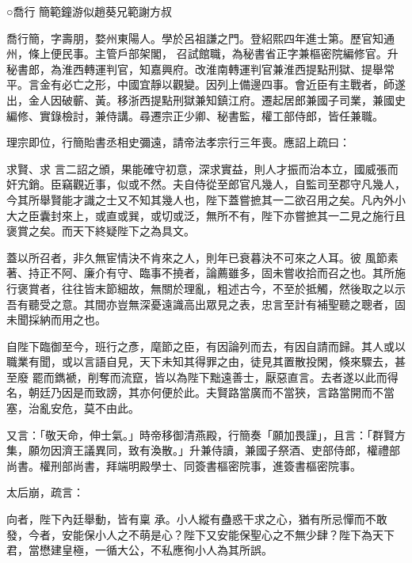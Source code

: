 
\begin{pinyinscope}

 ○喬行
 簡範鐘游似趙葵兄範謝方叔



 喬行簡，字壽朋，婺州東陽人。學於呂祖謙之門。登紹熙四年進士第。歷官知通州，條上便民事。主管戶部架閣，
 召試館職，為秘書省正字兼樞密院編修官。升秘書郎，為淮西轉運判官，知嘉興府。改淮南轉運判官兼淮西提點刑獄、提舉常平。言金有必亡之形，中國宜靜以觀變。因列上備邊四事。會近臣有主戰者，師遂出，金人因破蘄、黃。移浙西提點刑獄兼知鎮江府。遷起居郎兼國子司業，兼國史編修、實錄檢討，兼侍講。尋遷宗正少卿、秘書監，權工部侍郎，皆任兼職。



 理宗即位，行簡貽書丞相史彌遠，請帝法孝宗行三年喪。應詔上疏曰：



 求賢、求
 言二詔之頒，果能確守初意，深求實益，則人才振而治本立，國威張而奸宄銷。臣竊觀近事，似或不然。夫自侍從至郎官凡幾人，自監司至郡守凡幾人，今其所舉賢能才識之士又不知其幾人也，陛下蓋嘗摭其一二欲召用之矣。凡內外小大之臣囊封來上，或直或巽，或切或泛，無所不有，陛下亦嘗摭其一二見之施行且褒賞之矣。而天下終疑陛下之為具文。



 蓋以所召者，非久無宦情決不肯來之人，則年已衰暮決不可來之人耳。彼
 風節素著、持正不阿、廉介有守、臨事不撓者，論薦雖多，固未嘗收拾而召之也。其所施行褒賞者，往往皆末節細故，無關於理亂，粗述古今，不至於抵觸，然後取之以示吾有聽受之意。其間亦豈無深憂遠識高出眾見之表，忠言至計有補聖聽之聰者，固未聞採納而用之也。



 自陛下臨御至今，班行之彥，麾節之臣，有因論列而去，有因自請而歸。其人或以職業有聞，或以言語自見，天下未知其得罪之由，徒見其置散投閑，倏來驟去，甚至廢
 罷而鐫褫，削奪而流竄，皆以為陛下黜遠善士，厭惡直言。去者遂以此而得名，朝廷乃因是而致謗，其亦何便於此。夫賢路當廣而不當狹，言路當開而不當塞，治亂安危，莫不由此。



 又言：「敬天命，伸士氣。」時帝移御清燕殿，行簡奏「願加畏謹」，且言：「群賢方集，願勿因濟王議異同，致有渙散。」升兼侍讀，兼國子祭酒、吏部侍郎，權禮部尚書。權刑部尚書，拜端明殿學士、同簽書樞密院事，進簽書樞密院事。



 太后崩，疏言：



 向者，陛下內廷舉動，皆有稟
 承。小人縱有蠱惑干求之心，猶有所忌憚而不敢發，今者，安能保小人之不萌是心？陛下又安能保聖心之不無少肆？陛下為天下君，當懋建皇極，一循大公，不私應徇小人為其所誤。




\end{pinyinscope}

